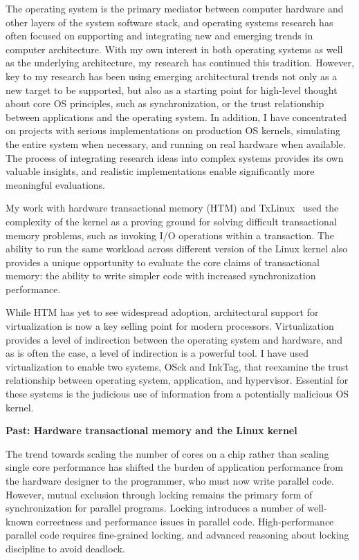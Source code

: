 \documentclass{article}
\newcommand{\osck}{OSck\xspace}
\newcommand{\inktag}{InkTag\xspace}
\begin{document}
The operating system is the primary mediator between computer hardware and
other layers of the system software stack, and operating systems research
has often focused on supporting and integrating new and emerging trends in
computer architecture. With my own interest in both operating systems as
well as the underlying architecture, my research has continued this
tradition.  However, key to my research has been using emerging
architectural trends not only as a new target to be supported, but also as
a starting point for high-level thought about core OS principles, such as
synchronization, or the trust relationship
between applications and the operating system. In addition, I have
concentrated on projects with serious implementations on production OS
kernels, simulating the entire system when necessary, and running on real
hardware when available. The process of integrating research ideas into
complex systems provides its own valuable insights, and realistic
implementations enable significantly more meaningful evaluations.

My work with hardware transactional memory (HTM) and TxLinux~\cite{txlinux}
used the complexity of the kernel as a proving ground for solving difficult
transactional memory problems, such as invoking I/O operations within a
transaction. The ability to run the same workload across different version
of the Linux kernel also provides a unique opportunity to evaluate the core
claims of transactional memory: the ability to write simpler code with
increased synchronization performance.

While HTM has yet to see widespread adoption, architectural support for
virtualization is now a key selling point for modern processors.
Virtualization provides a level of indirection between the operating
system and hardware, and as is often the case, a level
of indirection is a powerful tool. I have used virtualization to enable two
systems, \osck and \inktag, that reexamine the trust relationship between
operating system, application, and hypervisor. Essential for these systems
is the judicious use of information from a potentially malicious OS kernel.

{\bigskip \noindent\bf Past: Hardware transactional memory and the Linux
kernel}

\noindent
The trend towards scaling the number of cores on a chip rather than scaling
single core performance has shifted the burden of application performance
from the hardware designer to the programmer, who must now write parallel
code.
However, mutual exclusion through locking remains the primary form of
synchronization for parallel programs. Locking introduces a number of
well-known correctness and performance issues in parallel code.
High-performance parallel code requires fine-grained locking, and advanced
reasoning about locking discipline to avoid deadlock.
\end{document}
